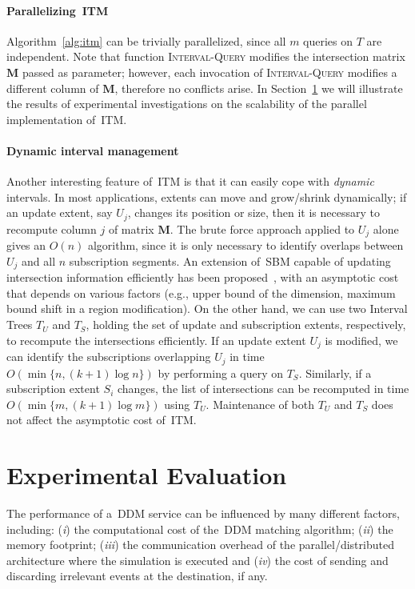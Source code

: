 \documentclass[10pt, conference, compsocconf]{IEEEtran}
\begin{document}
\paragraph*{Parallelizing~\ac{ITM}}
Algorithm~\ref{alg:itm} can be trivially parallelized, since all $m$
queries on $T$ are independent. Note that function
\textsc{Interval-Query} modifies the intersection matrix $\mathbf{M}$
passed as parameter; however, each invocation of
\textsc{Interval-Query} modifies a different column of $\mathbf{M}$,
therefore no conflicts arise.  In
Section~\ref{sec:experimental-evaluation} we will illustrate the
results of experimental investigations on the scalability of the
parallel implementation of~\ac{ITM}.

\paragraph*{Dynamic interval management} 
Another interesting feature of~\ac{ITM} is that it can easily cope
with \emph{dynamic} intervals. In most applications, extents can move
and grow/shrink dynamically; if an update extent, say $U_j$, changes
its position or size, then it is necessary to recompute column $j$ of
matrix $\mathbf{M}$. The brute force approach applied to $U_j$ alone
gives an $O(n)$ algorithm, since it is only necessary to identify
overlaps between $U_j$ and all $n$ subscription segments. An extension
of~\ac{SBM} capable of updating intersection information efficiently
has been proposed~\cite{Pan2011}, with an asymptotic cost that depends
on various factors (e.g., upper bound of the dimension, maximum bound
shift in a region modification). On the other hand, we can use two
Interval Trees $T_U$ and $T_S$, holding the set of update and
subscription extents, respectively, to recompute the intersections
efficiently. If an update extent $U_j$ is modified, we can identify
the subscriptions overlapping $U_j$ in time $O\left( \min \{n,
(k+1)\log n \}\right)$ by performing a query on $T_S$. Similarly, if a
subscription extent $S_i$ changes, the list of intersections can be
recomputed in time $O\left( \min\{m, (k+1) \log m\}\right)$ using
$T_U$. Maintenance of both $T_U$ and $T_S$ does not affect the
asymptotic cost of~\ac{ITM}.


\section{Experimental Evaluation}\label{sec:experimental-evaluation}

The performance of a~\ac{DDM} service can be influenced by many
different factors, including: (\emph{i}) the computational cost of
the~\ac{DDM} matching algorithm; (\emph{ii}) the memory footprint;
(\emph{iii}) the communication overhead of the parallel/distributed
architecture where the simulation is executed and (\emph{iv}) the
cost of sending and discarding irrelevant events at the destination,
if any.
\end{document}
